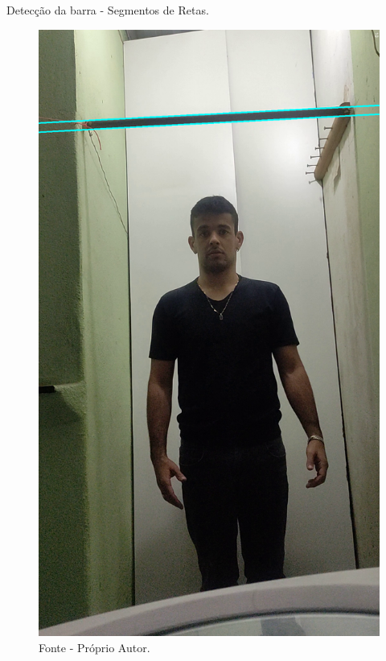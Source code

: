 \begin{frame}{Detecção da barra - Segmentos de Retas.}
    \begin{figure}[!ht]
    \centering
    \includegraphics[scale=0.1]{img/desenvolvimento/detectaBarra/barras.png}
    \caption*{Fonte - Próprio Autor.}
    \end{figure}
\end{frame}


